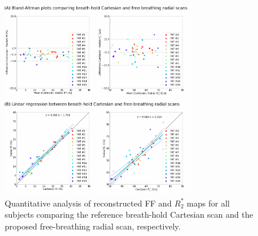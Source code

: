 \documentclass[journal,twoside,web]{ieeecolor}
\begin{document}
\begin{figure}
	\centering
	\includegraphics[width=0.75\textwidth]{../../figures/tan8.pdf}
	\caption{Quantitative analysis of reconstructed FF and $R_2^*$ maps 
		for all subjects comparing the reference breath-hold Cartesian scan 
		and the proposed free-breathing radial scan, respectively.}
	\label{FIG:LINREG}
\end{figure}
\end{document}
